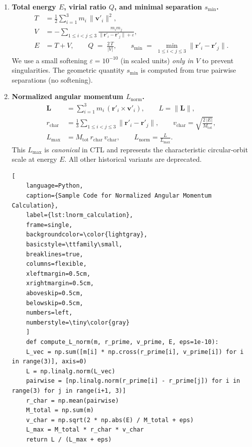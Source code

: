 \documentclass{article}
\begin{document}
\begin{enumerate}
    \item \textbf{Total energy $E$, virial ratio $Q$, and minimal separation $s_{\min}$.}
    \label{item:eqs}
    \begin{align}
    T &= \tfrac12 \sum_{i=1}^{3} m_i \,\lVert \mathbf v'_i \rVert^2, \\
    V &= - \sum_{1\le i<j\le 3} \frac{m_i m_j}{\lVert \mathbf r'_i - \mathbf r'_j \rVert + \varepsilon}, \\
    E &= T + V, \qquad
    Q \;=\; \frac{2\,T}{\lvert V \rvert}, \qquad
    s_{\min} \;=\; \min_{1\le i<j\le 3} \lVert \mathbf r'_i - \mathbf r'_j \rVert.
    \end{align}
    We use a small softening $\varepsilon = 10^{-10}$ (in scaled units) \emph{only in $V$} to
    prevent singularities. The geometric quantity $s_{\min}$ is computed from true pairwise
    separations (no softening).

    \item \textbf{Normalized angular momentum $L_{\mathrm{norm}}$.}
    \label{item:lnorm}
    \begin{align}
    \mathbf L &= \sum_{i=1}^3 m_i \,(\mathbf r'_i \times \mathbf v'_i), \qquad
    L = \lVert \mathbf L \rVert, \\
    r_{\mathrm{char}} &= \frac{1}{3} \sum_{1\le i<j\le 3} \lVert \mathbf r'_i - \mathbf r'_j \rVert, \qquad
    v_{\mathrm{char}} = \sqrt{\frac{2\,\lvert E \rvert}{M_{\mathrm{tot}}}}, \\
    L_{\max} &= M_{\mathrm{tot}} \, r_{\mathrm{char}} \, v_{\mathrm{char}}, \qquad
    L_{\mathrm{norm}} = \frac{L}{L_{\max}}.
    \end{align}
    This $L_{\max}$ is \emph{canonical} in CTL and represents the characteristic circular‐orbit
    scale at energy $E$. All other historical variants are deprecated.

    \begin{lstlisting}[
    language=Python,
    caption={Sample Code for Normalized Angular Momentum Calculation},
    label={lst:lnorm_calculation},
    frame=single,
    backgroundcolor=\color{lightgray},
    basicstyle=\ttfamily\small,
    breaklines=true,
    columns=flexible,
    xleftmargin=0.5cm,
    xrightmargin=0.5cm,
    aboveskip=0.5cm,
    belowskip=0.5cm,
    numbers=left,
    numberstyle=\tiny\color{gray}
    ]
    def compute_L_norm(m, r_prime, v_prime, E, eps=1e-10):
    L_vec = np.sum([m[i] * np.cross(r_prime[i], v_prime[i]) for i in range(3)], axis=0)
    L = np.linalg.norm(L_vec)
    pairwise = [np.linalg.norm(r_prime[i] - r_prime[j]) for i in range(3) for j in range(i+1, 3)]
    r_char = np.mean(pairwise)
    M_total = np.sum(m)
    v_char = np.sqrt(2 * np.abs(E) / M_total + eps)
    L_max = M_total * r_char * v_char
    return L / (L_max + eps)
    \end{lstlisting}



\end{enumerate}
\end{document}
